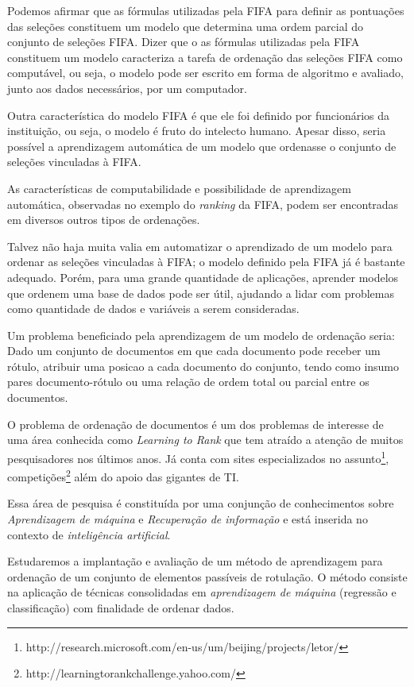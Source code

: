Podemos afirmar que as fórmulas utilizadas pela FIFA para definir as pontuações das seleções constituem um modelo que determina uma ordem parcial do conjunto de seleções FIFA. Dizer que o as fórmulas utilizadas pela FIFA constituem um modelo caracteriza a tarefa de ordenação das seleções FIFA como computável, ou seja, o modelo pode ser escrito em forma de algoritmo e avaliado, junto aos dados necessários, por um computador.

Outra característica do modelo FIFA é que ele foi definido por funcionários da instituição, ou seja, o modelo é fruto do intelecto humano. Apesar disso, seria possível a aprendizagem automática de um modelo que ordenasse o conjunto de seleções vinculadas à FIFA.

As características de computabilidade e possibilidade de aprendizagem automática, observadas no exemplo do \emph{ranking} da FIFA, podem ser encontradas em diversos outros tipos de ordenações.

Talvez não haja muita valia em automatizar o aprendizado de um modelo para ordenar as seleções vinculadas à FIFA; o modelo definido pela FIFA já é bastante adequado. Porém, para uma grande quantidade de aplicações, aprender modelos que ordenem uma base de dados pode ser útil, ajudando a lidar com problemas como quantidade de dados e variáveis a serem consideradas.

Um problema beneficiado pela aprendizagem de um modelo de ordenação seria: Dado um conjunto de documentos em que cada documento pode receber um rótulo, atribuir uma posicao a cada documento do conjunto, tendo como insumo pares documento-rótulo ou uma relação de ordem total ou parcial entre os documentos.

O problema de ordenação de documentos é um dos problemas de interesse de uma área  conhecida como \emph{Learning to Rank} que tem atraído a atenção de muitos pesquisadores nos últimos anos. Já conta com sites especializados no assunto\footnote{http://research.microsoft.com/en-us/um/beijing/projects/letor/}, competições\footnote{http://learningtorankchallenge.yahoo.com/} além do apoio das gigantes de TI.

Essa área de pesquisa é constituída por uma conjunção de conhecimentos sobre \emph{Aprendizagem de máquina} e \emph{Recuperação de informação} e está inserida no contexto de \emph{inteligência artificial}.

Estudaremos a implantação e avaliação de um método de aprendizagem para ordenação de um conjunto de elementos passíveis de rotulação. O método consiste na aplicação de técnicas consolidadas em \emph{aprendizagem de máquina} (regressão e classificação) com finalidade de ordenar dados.